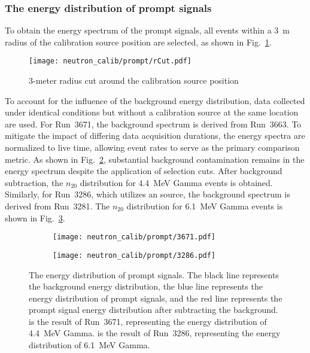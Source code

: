\subsubsection{The energy distribution of prompt signals}
To obtain the energy spectrum of the prompt signals, all events within a \SI{3}{m} radius of the calibration source position are selected, as shown in Fig.~\ref{fig:RtoSource}.
\begin{figure}[htbp]
	\centering
	\texttt{[image: neutron\_calib/prompt/rCut.pdf]}
	\caption{3-meter radius cut around the calibration source position}
	\label{fig:RtoSource}
\end{figure}
To account for the influence of the background energy distribution, data collected under identical conditions but without a calibration source at the same location are used.
For Run~3671, the background spectrum is derived from Run~3663.
To mitigate the impact of differing data acquisition durations, the energy spectra are normalized to live time, allowing event rates to serve as the primary comparison metric.
As shown in Fig.~\ref{fig:3671n20}, substantial background contamination remains in the energy spectrum despite the application of selection cuts.
After background subtraction, the $n_{20}$ distribution for \SI{4.4}{MeV} Gamma events is obtained. Similarly, for Run~3286, which utilizes an  source, the background spectrum is derived from Run~3281. The $n_{20}$ distribution for \SI{6.1}{MeV} Gamma events is shown in Fig.~\ref{fig:3286n20}.
\begin{figure}[htbp]
	\centering
	\begin{subfigure}{0.5\textwidth}
		\centering
		\texttt{[image: neutron\_calib/prompt/3671.pdf]}
		\caption{}
		\label{fig:3671n20}
	\end{subfigure}%
	\begin{subfigure}{0.5\textwidth}
		\centering
		\texttt{[image: neutron\_calib/prompt/3286.pdf]}
		\caption{}
		\label{fig:3286n20}
	\end{subfigure}
	\caption{The energy distribution of prompt signals. The black line represents the background energy distribution, the blue line represents the energy distribution of prompt signals, and the red line represents the prompt signal energy distribution after subtracting the background.  is the result of Run~3671, representing the energy distribution of \SI{4.4}{MeV} Gamma.  is the result of Run~3286, representing the energy distribution of \SI{6.1}{MeV} Gamma.}
	\label{fig:n20}
\end{figure}


